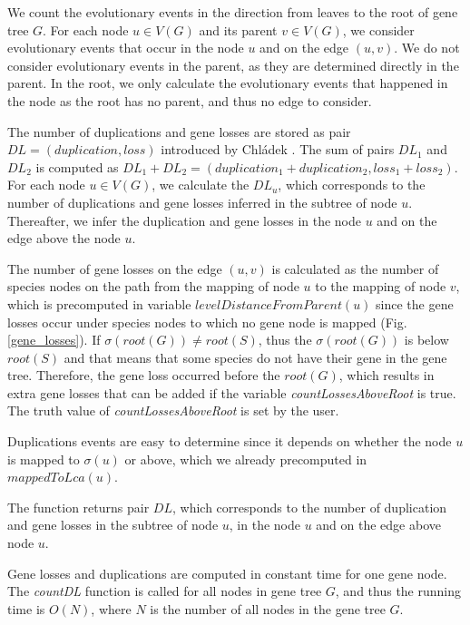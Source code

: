 We count the evolutionary events in the direction from leaves to the root of gene tree $G$. For each node $u \in V(G)$ and its parent $v \in V(G)$, we consider evolutionary events that occur in the node $u$ and on the edge $(u, v)$. We do not consider evolutionary events in the parent, as they are determined directly in the parent. In the root, we only calculate the evolutionary events that happened in the node as the root has no parent, and thus no edge to consider.

The number of duplications and gene losses are stored as pair $DL = (duplication, loss)$ introduced by Chládek \cite{chladek_thesis}. The sum of pairs $DL_1$ and $DL_2$ is computed as $DL_1+DL_2=(duplication_1+duplication_2, loss_1+loss_2)$. For each node $u \in V(G)$, we calculate the $DL_u$, which corresponds to the number of duplications and gene losses inferred in the subtree of node $u$. Thereafter, we infer the duplication and gene losses in the node $u$ and on the edge above the node $u$.

The number of gene losses on the edge $(u, v)$ is calculated as the number of species nodes on the path from the mapping of node $u$ to the mapping of node $v$, which is precomputed in variable $levelDistanceFromParent(u)$ since the gene losses occur under species nodes to which no gene node is mapped (Fig. \ref{gene_losses}). If $\sigma(root(G)) \ne root(S)$, thus the $\sigma(root(G))$ is below $root(S)$ and that means that some species do not have their gene in the gene tree. Therefore, the gene loss occurred before the $root(G)$, which results in extra gene losses that can be added if the variable \emph{countLossesAboveRoot} is true. The truth value of \emph{countLossesAboveRoot} is set by the user.

Duplications events are easy to determine since it depends on whether the node $u$ is mapped to $\sigma(u)$ or above, which we already precomputed in $mappedToLca(u)$.

The function returns pair $DL$, which corresponds to the number of duplication and gene losses in the subtree of node $u$, in the node $u$ and on the edge above node $u$.

Gene losses and duplications are computed in constant time for one gene node. The \emph{countDL} function is called for all nodes in gene tree $G$, and thus the running time is $O(N)$, where $N$ is the number of all nodes in the gene tree $G$.

